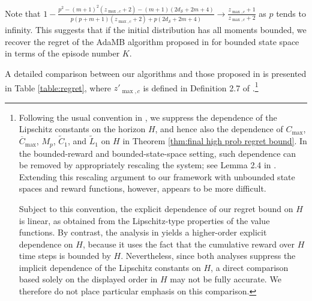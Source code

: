 \documentclass[final,supplement]{siamart251216}
\begin{document}
\begin{remark}\label{re:comparison}

Note that  $1-\frac{p^{2}-(m+1)^{2}(z_{\max,c}+2)-(m+1)(2d_{\mathcal{S}}+2m+4)}{p(p+m+1)(z_{\max,c}+2)+p(2d_{\mathcal{S}}+2m+4)} \rightarrow\frac{z_{\max,c}+1}{z_{\max,c}+2}$ as $p$ tends to infinity.  This suggests that if the initial distribution has all moments bounded, we recover the regret of the AdaMB algorithm proposed in \cite{sinclair2023adaptive} for bounded state space in terms of the episode number $K$.

A detailed comparison between our algorithms and those proposed in \cite{sinclair2023adaptive} is presented in Table \ref{table:regret}, where $z'_{\max,c}$  is defined in Definition 2.7 of \cite{sinclair2023adaptive}.\footnote{
Following the usual convention in \cite{domingues2021kernel,sinclair2023adaptive}, we suppress the dependence of the Lipschitz constants on the horizon $H$, and hence also the dependence of $C_{\max}$, $\overline{C}_{\max}$, $M_p$, $\widetilde{C}_1$, and $\widetilde{L}_1$ on $H$ in Theorem \ref{thm:final high prob regret bound}. In the bounded-reward and bounded-state-space setting, such dependence can be removed by appropriately rescaling the system; see Lemma 2.4 in \cite{sinclair2023adaptive}. Extending this rescaling argument to our framework with unbounded state spaces and reward functions, however, appears to be more difficult.

Subject to this convention, the explicit dependence of our regret bound on $H$ is linear, as obtained from the Lipschitz-type properties of the value functions. By contrast, the analysis in \cite{sinclair2023adaptive} yields a higher-order explicit dependence on $H$, because it uses the fact that the cumulative reward over $H$ time steps is bounded by $H$. Nevertheless, since both analyses suppress the implicit dependence of the Lipschitz constants on $H$, a direct comparison based solely on the displayed order in $H$ may not be fully accurate. We therefore do not place particular emphasis on this comparison.}






\end{remark}
\end{document}
